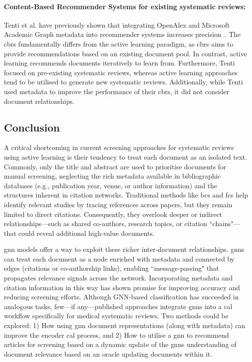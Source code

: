 \documentclass[10pt,oneside]{book}
\begin{document}
\paragraph{Content-Based Recommender Systems for existing systematic reviews:}
Tenti et al. have previously shown that integrating OpenAlex and Microsoft Academic Graph metadata into recommender systems increases precision~\cite{tenti_contreviews_2025}. The \gls*{cbrs} fundamentally differs from the active learning paradigm, as \gls*{cbrs} aims to provide recommendations based on an existing document pool. In contrast, active learning recommends documents iteratively to learn from. Furthermore, Tenti focused on pre-existing systematic reviews, whereas active learning approaches tend to be utilised to generate new systematic reviews. Additionally, while Tenti used metadata to improve the performance of their \gls*{cbrs}, it did not consider document relationships.

\subsection{Conclusion}
A critical shortcoming in current screening approaches for systematic reviews using active learning is their tendency to treat each document as an isolated text. Commonly, only the title and abstract are used to prioritise documents for manual screening, neglecting the rich metadata available in bibliographic databases (e.g., publication year, venue, or author information) and the structures inherent in citation networks. Traditional methods like \gls*{bcs} and \gls*{fcs} help identify relevant studies by tracing references across papers, but they remain limited to direct citations. Consequently, they overlook deeper or indirect relationships—such as shared co‐authors, research topics, or citation ``chains"—that could reveal additional high‐value documents.

\gls*{gnn} models offer a way to exploit these richer inter‐document relationships. \glspl*{gnn} can treat each document as a node enriched with metadata and connected by edges (citations or co‐authorship links), enabling ``message‐passing" that propagates relevance signals across the network. Incorporating metadata and citation information in this way has shown promise for improving accuracy and reducing screening efforts. Although GNN‐based classification has succeeded in analogous tasks, few—if any—published approaches integrate \glspl*{gnn} into a \gls*{cal} workflow specifically for medical systematic reviews. Two methods could be explored: 1) How using \gls*{gnn} document representations (along with metadata) can improve the encoder \gls*{cal} process, and 2) How to utilise a \gls*{gnn} to recommend articles for screening based on a dynamic update of the \glspl*{gnn} understanding of document relevance based on an oracle updating documents within it. 
\end{document}
